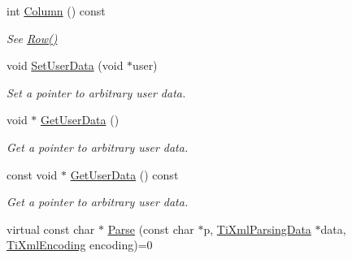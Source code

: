 \begin{DoxyCompactItemize}
int \hyperlink{classTiXmlBase_ab54bfb9b70fe6dd276e7b279cab7f003}{Column} () const 
\begin{DoxyCompactList}\small\item\em See \hyperlink{classTiXmlBase_a024bceb070188df92c2a8d8852dd0853}{Row()} \item\end{DoxyCompactList}\item 
void \hyperlink{classTiXmlBase_ac6b3e0f790930d4970ec30764e937b5d}{SetUserData} (void $\ast$user)
\begin{DoxyCompactList}\small\item\em Set a pointer to arbitrary user data. \item\end{DoxyCompactList}\item 
void $\ast$ \hyperlink{classTiXmlBase_a6559a530ca6763fc301a14d77ed28c17}{GetUserData} ()
\begin{DoxyCompactList}\small\item\em Get a pointer to arbitrary user data. \item\end{DoxyCompactList}\item 
const void $\ast$ \hyperlink{classTiXmlBase_ad0120210e4680ef2088601753ce0ede4}{GetUserData} () const 
\begin{DoxyCompactList}\small\item\em Get a pointer to arbitrary user data. \item\end{DoxyCompactList}\item 
virtual const char $\ast$ \hyperlink{classTiXmlBase_a00e4edb0219d00a1379c856e5a1d2025}{Parse} (const char $\ast$p, \hyperlink{classTiXmlParsingData}{TiXmlParsingData} $\ast$data, \hyperlink{tinyxml_8h_a88d51847a13ee0f4b4d320d03d2c4d96}{TiXmlEncoding} encoding)=0
\end{DoxyCompactItemize}
